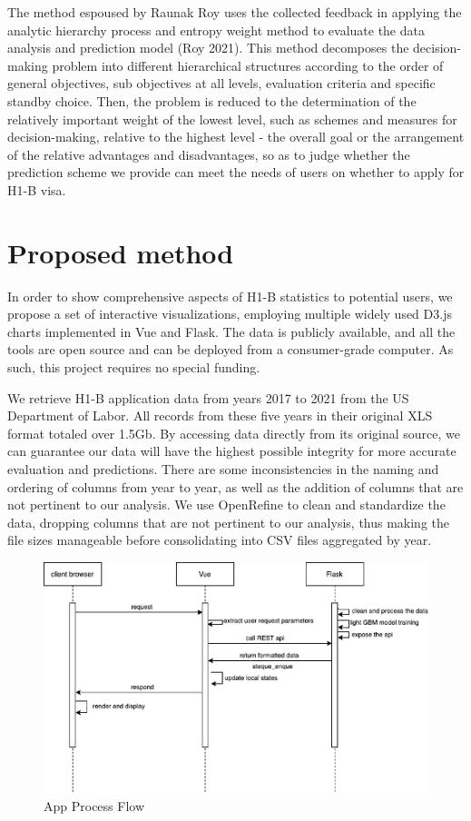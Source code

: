 \documentclass[sigconf]{acmart}
\begin{document}
The method espoused by Raunak Roy uses the collected feedback in applying the analytic hierarchy process and entropy 
weight method to evaluate the data analysis and prediction model (Roy 2021). This method decomposes the decision-making problem into different 
hierarchical structures according to the order of general objectives, sub objectives at all levels, evaluation criteria and specific 
standby choice. Then, the problem is reduced to the determination of the relatively important weight of the lowest level, such as 
schemes and measures for decision-making, relative to the highest level - the overall goal or the arrangement of the relative 
advantages and disadvantages, so as to judge whether the prediction scheme we provide can meet the needs of users on whether to 
apply for H1-B visa.


\section{Proposed method}


In order to show comprehensive aspects of H1-B statistics to potential users, we propose a set of interactive visualizations, 
employing multiple widely used D3.js charts implemented in Vue and Flask.  The data is publicly available, and all the tools 
are open source and can be deployed from a consumer-grade computer. As such, this project requires no special funding. 



We retrieve H1-B application data from years 2017 to 2021 from the US Department of Labor. All records from these five 
years in their original XLS format totaled over 1.5Gb. By accessing data directly from its original source, we can 
guarantee our data will have the highest possible integrity for more accurate evaluation and predictions. 
There are some inconsistencies in the naming and ordering of columns from year to year, as well as the addition of columns that are not pertinent to 
our analysis.  We use OpenRefine to clean and standardize the data, dropping columns that are not pertinent to our 
analysis, thus making the file sizes manageable before consolidating into CSV files aggregated by year. 
\begin{figure}
  \includegraphics[width=\linewidth]{fig4.png}
  \caption{App Process Flow}
  \label{fig:appprocessflow}
\end{figure}
\end{document}
